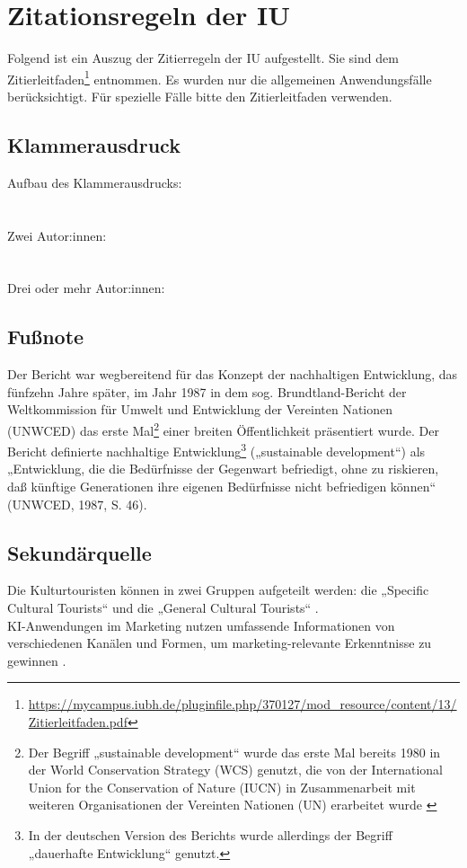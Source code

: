 
\section{Zitationsregeln der IU}
Folgend ist ein Auszug der Zitierregeln der IU aufgestellt. Sie sind dem Zitierleitfaden\footnote{\url{https://mycampus.iubh.de/pluginfile.php/370127/mod_resource/content/13/Zitierleitfaden.pdf}} entnommen. Es wurden nur die allgemeinen Anwendungsfälle berücksichtigt. Für spezielle Fälle bitte den Zitierleitfaden verwenden.
\subsection{Klammerausdruck}
Aufbau des Klammerausdrucks:\\
\parencite[182-185]{primarysource}\\
\\
Zwei Autor:innen:\\
\parencite[182-185]{Doe2023}\\
\\
Drei oder mehr Autor:innen:\\
\parencite[182-185]{syme2011f}

\subsection{Fußnote}
Der Bericht war wegbereitend für das Konzept der nachhaltigen Entwicklung, das fünfzehn
Jahre später, im Jahr 1987 in dem sog. Brundtland-Bericht der Weltkommission für Umwelt
und Entwicklung der Vereinten Nationen (UNWCED) das erste Mal\footnote{Der Begriff „sustainable development“ wurde das erste Mal bereits 1980 in der World Conservation Strategy (WCS) genutzt, die von der International Union for the Conservation of Nature (IUCN) in Zusammenarbeit mit weiteren Organisationen der Vereinten Nationen (UN) erarbeitet wurde \parencite[182-185]{syme2011f}} einer breiten Öffentlichkeit
präsentiert wurde. Der Bericht definierte nachhaltige Entwicklung\footnote{In der deutschen Version des Berichts wurde allerdings der Begriff „dauerhafte Entwicklung“ genutzt.} („sustainable development“) als „Entwicklung, die die Bedürfnisse der Gegenwart befriedigt, ohne zu riskieren, daß künftige Generationen ihre eigenen Bedürfnisse nicht befriedigen können“ (UNWCED, 1987, S. 46). 

\subsection{Sekundärquelle}
Die Kulturtouristen können in zwei Gruppen aufgeteilt werden: die „Specific Cultural Tourists“ und die „General Cultural Tourists“ .\\
KI-Anwendungen im Marketing nutzen umfassende Informationen von verschiedenen Kanälen
und Formen, um marketing-relevante Erkenntnisse zu gewinnen .

